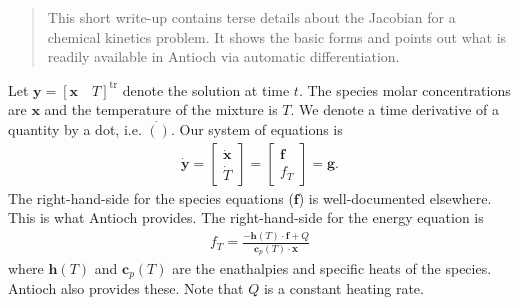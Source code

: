 \documentclass{article}
\newcommand{\lr}[1]{\left(#1\right)}
\begin{document}
  \begin{abstract}
    This short write-up contains terse details about the Jacobian for a chemical kinetics problem.  
    It shows the basic forms and points out what is readily available in Antioch via automatic 
    differentiation.
  \end{abstract}

  Let $\mathbf{y} = \left[\mathbf{x} \quad T\right]^{\mathrm{tr}}$ denote the solution at time $t$.  The 
  species molar concentrations are $\mathbf{x}$ and the temperature of the mixture is $T$.  We denote 
  a time derivative of a quantity by a dot, i.e. $\dot{\lr{ }}$.  Our system of equations is 
  \begin{align}
    \dot{\mathbf{y}} = \begin{bmatrix}\dot{\mathbf{x}} \\ \dot{T}\end{bmatrix} = 
      \begin{bmatrix}\mathbf{f} \\ f_{T}\end{bmatrix} = \mathbf{g}.
  \end{align}
  The right-hand-side for the species equations ($\mathbf{f}$) is well-documented elsewhere.  This is 
  what Antioch provides.  The right-hand-side for the energy equation is 
  \begin{align}
    f_{T} = \frac{-\mathbf{h}\lr{T}\cdot\mathbf{f} + Q}{\mathbf{c}_{p}\lr{T}\cdot\mathbf{x}}
  \end{align}
  where $\mathbf{h}\lr{T}$ and $\mathbf{c}_{p}\lr{T}$ are the enathalpies and specific heats of the 
  species.  Antioch also provides these.  Note that $Q$ is a constant heating rate.
\end{document}
